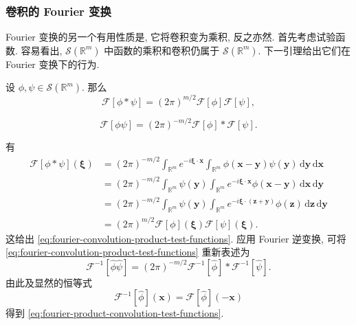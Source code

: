 \subsubsection{卷积的 Fourier 变换}\label{subsec:fourier-convolutions}

Fourier 变换的另一个有用性质是, 它将卷积变为乘积, 反之亦然. 首先考虑试验函数. 容易看出, $\mathcal{S}(\mathbb{R}^m)$ 中函数的乘积和卷积仍属于 $\mathcal{S}(\mathbb{R}^m)$. 下一引理给出它们在 Fourier 变换下的行为.

\begin{Lemma}
\label{lem:fourier-convolution-test-functions}
设 $\phi,\psi\in\mathcal{S}(\mathbb{R}^m)$. 那么
\begin{equation}\label{eq:fourier-convolution-product-test-functions}
\mathcal{F}[\phi*\psi]=(2\pi)^{m/2}\mathcal{F}[\phi]\mathcal{F}[\psi],
\end{equation}

\begin{equation}\label{eq:fourier-product-convolution-test-functions}
\mathcal{F}[\phi\psi]=(2\pi)^{-m/2}\mathcal{F}[\phi]*\mathcal{F}[\psi].
\end{equation}

\end{Lemma}

\begin{Proof}
有
\begin{equation}\label{eq:fourier-convolution-test-functions-proof}
\begin{aligned}
\mathcal{F}[\phi*\psi](\bm{\xi})
&=(2\pi)^{-m/2}\int_{\mathbb{R}^m}e^{-i\bm{\xi}\cdot\bm{x}}\int_{\mathbb{R}^m}\phi(\bm{x}-\bm{y})\psi(\bm{y})\,\mathrm{d}\bm{y}\,\mathrm{d}\bm{x}\\
&=(2\pi)^{-m/2}\int_{\mathbb{R}^m}\psi(\bm{y})\int_{\mathbb{R}^m}e^{-i\bm{\xi}\cdot\bm{x}}\phi(\bm{x}-\bm{y})\,\mathrm{d}\bm{x}\,\mathrm{d}\bm{y}\\
&=(2\pi)^{-m/2}\int_{\mathbb{R}^m}\psi(\bm{y})\int_{\mathbb{R}^m}e^{-i\bm{\xi}\cdot(\bm{z}+\bm{y})}\phi(\bm{z})\,\mathrm{d}\bm{z}\,\mathrm{d}\bm{y}\\
&=(2\pi)^{m/2}\mathcal{F}[\phi](\bm{\xi})\mathcal{F}[\psi](\bm{\xi}).
\end{aligned}
\end{equation}
这给出 \eqref{eq:fourier-convolution-product-test-functions}. 应用 Fourier 逆变换, 可将 \eqref{eq:fourier-convolution-product-test-functions} 重新表述为
\begin{equation}\label{eq:inverse-fourier-product-convolution}
\mathcal{F}^{-1}[\widehat\phi\widehat\psi]=(2\pi)^{-m/2}\mathcal{F}^{-1}[\widehat\phi]*\mathcal{F}^{-1}[\widehat\psi].
\end{equation}
由此及显然的恒等式
\begin{equation}\label{eq:inverse-fourier-forward-reflection}
\mathcal{F}^{-1}[\widehat\phi](\bm{x})=\mathcal{F}[\widehat\phi](-\bm{x})
\end{equation}
得到 \eqref{eq:fourier-product-convolution-test-functions}.
\end{Proof}

